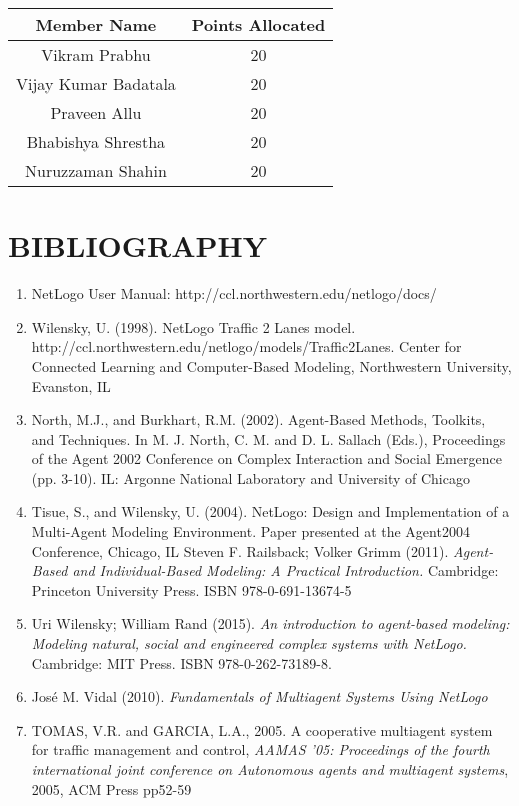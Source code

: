 \documentclass[11pt,a4paper]{article}
\begin{document}
\begin{tabular}{|c|c|}
	\hline
	\textbf{Member Name} & \textbf{Points Allocated}\\
    \hline
    Vikram Prabhu & 20\\
    \hline
	Vijay Kumar Badatala & 20\\
    \hline
    Praveen Allu & 20\\
    \hline
    Bhabishya Shrestha & 20\\
    \hline
    Nuruzzaman Shahin & 20\\
    \hline    
\end{tabular}

\section{BIBLIOGRAPHY}

\begin{enumerate}

\item NetLogo User Manual: http://ccl.northwestern.edu/netlogo/docs/

\item Wilensky, U. (1998). NetLogo Traffic 2 Lanes model.\newline
http://ccl.northwestern.edu/netlogo/models/Traffic2Lanes. Center for Connected Learning and Computer-Based Modeling, Northwestern University, Evanston, IL

\item North, M.J., and Burkhart, R.M. (2002). Agent-Based Methods, Toolkits, and Techniques. In M. J. North, C. M. and D. L. Sallach (Eds.), Proceedings of the Agent 2002 Conference on Complex Interaction and Social Emergence (pp. 3-10). IL: Argonne National Laboratory and University of Chicago

\item Tisue, S., and Wilensky, U. (2004). NetLogo: Design and Implementation of a Multi-Agent Modeling Environment. Paper presented at the Agent2004 Conference, Chicago, IL
Steven F. Railsback; Volker Grimm (2011). \textit{Agent-Based and Individual-Based Modeling: A Practical Introduction.} Cambridge: Princeton University Press. ISBN 978-0-691-13674-5

\item Uri Wilensky; William Rand (2015). \textit{An introduction to agent-based modeling: Modeling natural, social and engineered complex systems with NetLogo.} Cambridge: MIT Press. ISBN 978-0-262-73189-8.

\item José M. Vidal (2010). \textit{Fundamentals of Multiagent Systems Using NetLogo}

\item TOMAS, V.R. and GARCIA, L.A., 2005. A cooperative multiagent system for traffic management and control, \textit{AAMAS '05: Proceedings of the fourth international joint conference on Autonomous agents and multiagent systems}, 2005, ACM Press pp52-59

\end{enumerate}
\end{document}
